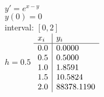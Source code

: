 {
$y' = e^{x-y}$\\
$y(0)=0$\\
interval: $[0,2]$\\
$h = 0.5$
}
{
	$\begin{array}{l | l}
		x_i & y_i    \\ \hline
		0.0 & 0.0000 \\
		0.5 & 0.5000 \\
		1.0 & 1.8591 \\
		1.5 & 10.5824 \\
		2.0 & 88378.1190 \\
	\end{array}$
}